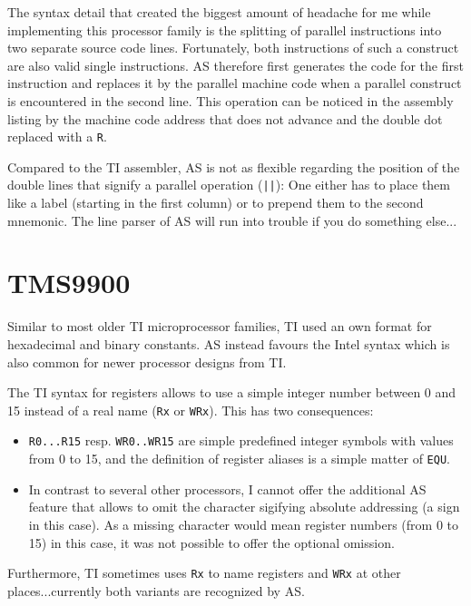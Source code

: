 \documentclass[12pt,twoside]{report}
\newcommand{\tty}[1]{{\tt #1}}
\begin{document}
The syntax detail that created the biggest amount of headache for me
while implementing this processor family is the splitting of parallel
instructions into two separate source code lines.  Fortunately, both
instructions of such a construct are also valid single instructions. 
AS therefore first generates the code for the first instruction and
replaces it by the parallel machine code when a parallel construct is
encountered in the second line.  This operation can be noticed in the
assembly listing by the machine code address that does not advance
and the double dot replaced with a \tty{R}.

Compared to the TI assembler, AS is not as flexible regarding the
position of the double lines that signify a parallel operation
(\tty{||}): One either has to place them like a label (starting in the
first column) or to prepend them to the second mnemonic.  The line
parser of AS will run into trouble if you do something else... 


\section{TMS9900}

Similar to most older TI microprocessor families, TI used an own
format for hexadecimal and binary constants.  AS instead favours the
Intel syntax which is also common for newer processor designs from
TI.

The TI syntax for registers allows to use a simple integer number
between 0 and 15 instead of a real name (\tty{Rx} or \tty{WRx}).
This has two consequences:
\begin{itemize}
\item{\tty{R0...R15} resp. \tty{WR0..WR15} are simple predefined integer
      symbols with values from 0 to 15, and the definition of register
      aliases is a simple matter of \tty{EQU}.}
\item{In contrast to several other processors, I cannot offer the
      additional AS feature that allows to omit the character sigifying
      absolute addressing (a \@ sign in this case).  As a missing
      character would mean register numbers (from 0 to 15) in this case,
      it was not possible to offer the optional omission.}
\end{itemize}
Furthermore, TI sometimes uses \tty{Rx} to name registers and \tty{WRx}
at other places...currently both variants are recognized by AS.
\end{document}
